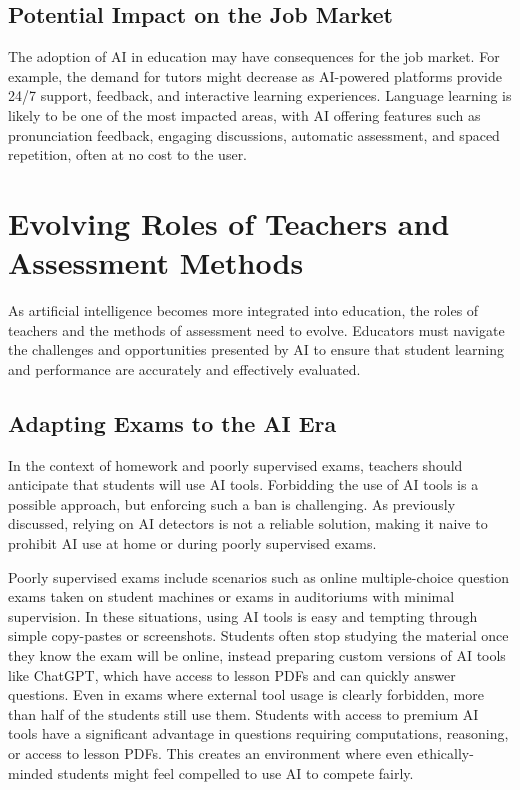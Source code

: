 \documentclass{article}
\begin{document}
\subsection{Potential Impact on the Job Market}

The adoption of AI in education may have consequences for the job market.
For example, the demand for tutors might decrease as AI-powered platforms
provide 24/7 support, feedback, and interactive learning experiences.
Language learning is likely to be one of the most impacted areas, with
AI offering features such as pronunciation feedback, engaging discussions,
automatic assessment, and spaced repetition, often at no cost to the user.






\newpage

\section{Evolving Roles of Teachers and Assessment Methods}

As artificial intelligence becomes more integrated into education, the roles of teachers and the methods of assessment need to evolve. Educators must navigate the challenges and opportunities presented by AI to ensure that student learning and performance are accurately and effectively evaluated.

\subsection{Adapting Exams to the AI Era}

In the context of homework and poorly supervised exams, teachers should anticipate that students will use AI tools. Forbidding the use of AI tools is a possible approach, but enforcing such a ban is challenging. As previously discussed, relying on AI detectors is not a reliable solution, making it naive to prohibit AI use at home or during poorly supervised exams.

Poorly supervised exams include scenarios such as online multiple-choice question exams taken on student machines or exams in auditoriums with minimal supervision. In these situations, using AI tools is easy and tempting through simple copy-pastes or screenshots. Students often stop studying the material once they know the exam will be online, instead preparing custom versions of AI tools like ChatGPT, which have access to lesson PDFs and can quickly answer questions. Even in exams where external tool usage is clearly forbidden, more than half of the students still use them. Students with access to premium AI tools have a significant advantage in questions requiring computations, reasoning, or access to lesson PDFs. This creates an environment where even ethically-minded students might feel compelled to use AI to compete fairly.
\end{document}
